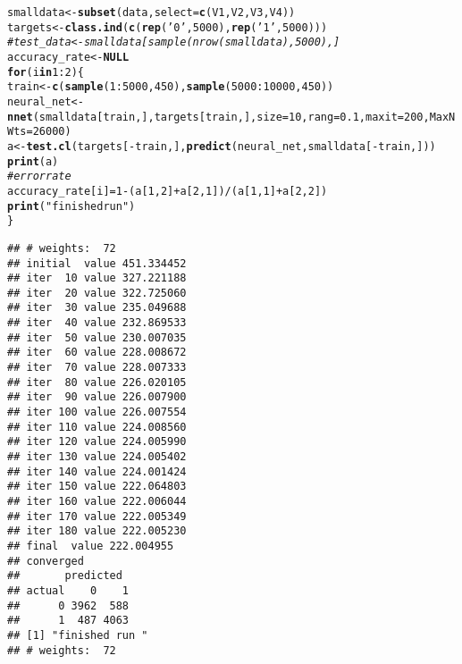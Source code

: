 \documentclass[titlepage]{article}\usepackage[]{graphicx}\usepackage[]{color}
\makeatletter
\newcommand{\hlnum}[1]{\textcolor[rgb]{0.686,0.059,0.569}{#1}}%
\newcommand{\hlstr}[1]{\textcolor[rgb]{0.192,0.494,0.8}{#1}}%
\newcommand{\hlcom}[1]{\textcolor[rgb]{0.678,0.584,0.686}{\textit{#1}}}%
\newcommand{\hlopt}[1]{\textcolor[rgb]{0,0,0}{#1}}%
\newcommand{\hlstd}[1]{\textcolor[rgb]{0.345,0.345,0.345}{#1}}%
\newcommand{\hlkwa}[1]{\textcolor[rgb]{0.161,0.373,0.58}{\textbf{#1}}}%
\newcommand{\hlkwb}[1]{\textcolor[rgb]{0.69,0.353,0.396}{#1}}%
\newcommand{\hlkwc}[1]{\textcolor[rgb]{0.333,0.667,0.333}{#1}}%
\newcommand{\hlkwd}[1]{\textcolor[rgb]{0.737,0.353,0.396}{\textbf{#1}}}%
\newenvironment{kframe}{%
 \def\at@end@of@kframe{}%
 \ifinner\ifhmode%
  \def\at@end@of@kframe{\end{minipage}}%
  \begin{minipage}{\columnwidth}%
 \fi\fi%
 \def\FrameCommand##1{\hskip\@totalleftmargin \hskip-\fboxsep
 \colorbox{shadecolor}{##1}\hskip-\fboxsep
     \hskip-\linewidth \hskip-\@totalleftmargin \hskip\columnwidth}%
 \MakeFramed {\advance\hsize-\width
   \@totalleftmargin\z@ \linewidth\hsize
   \@setminipage}}%
 {\par\unskip\endMakeFramed%
 \at@end@of@kframe}
\newenvironment{knitrout}{}{} %
\makeatother
\begin{document}
\begin{knitrout}
\color{fgcolor}\begin{kframe}
\begin{alltt}
\hlstd{smalldata} \hlkwb{<-} \hlkwd{subset}\hlstd{(data,} \hlkwc{select} \hlstd{=} \hlkwd{c}\hlstd{(V1,V2, V3, V4))}
\hlstd{targets} \hlkwb{<-} \hlkwd{class.ind}\hlstd{(}\hlkwd{c}\hlstd{(}\hlkwd{rep}\hlstd{(}\hlstr{'0'}\hlstd{,} \hlnum{5000}\hlstd{),} \hlkwd{rep}\hlstd{(}\hlstr{'1'}\hlstd{,}\hlnum{5000}\hlstd{)))}
\hlcom{#test_data <- smalldata[sample(nrow(smalldata), 5000),]}
\hlstd{accuracy_rate} \hlkwb{<-} \hlkwa{NULL}
\hlkwa{for} \hlstd{(i} \hlkwa{in} \hlnum{1}\hlopt{:}\hlnum{2}\hlstd{) \{}
  \hlstd{train} \hlkwb{<-} \hlkwd{c}\hlstd{(}\hlkwd{sample}\hlstd{(}\hlnum{1}\hlopt{:}\hlnum{5000}\hlstd{,} \hlnum{450}\hlstd{),} \hlkwd{sample}\hlstd{(}\hlnum{5000}\hlopt{:}\hlnum{10000}\hlstd{,}\hlnum{450}\hlstd{))}
  \hlstd{neural_net} \hlkwb{<-} \hlkwd{nnet}\hlstd{(smalldata[train,], targets[train,],} \hlkwc{size}\hlstd{=}\hlnum{10}\hlstd{,} \hlkwc{rang} \hlstd{=} \hlnum{0.1}\hlstd{,} \hlkwc{maxit} \hlstd{=}\hlnum{200}\hlstd{,} \hlkwc{MaxNWts} \hlstd{=} \hlnum{26000}\hlstd{)}
  \hlstd{a} \hlkwb{<-} \hlkwd{test.cl}\hlstd{(targets[}\hlopt{-}\hlstd{train,],} \hlkwd{predict}\hlstd{(neural_net, smalldata[}\hlopt{-}\hlstd{train,]))}
  \hlkwd{print}\hlstd{(a)}
  \hlcom{# error rate}
  \hlstd{accuracy_rate[i]} \hlkwb{=} \hlnum{1}\hlopt{-}\hlstd{(a[}\hlnum{1}\hlstd{,}\hlnum{2}\hlstd{]}\hlopt{+}\hlstd{a[}\hlnum{2}\hlstd{,}\hlnum{1}\hlstd{])} \hlopt{/} \hlstd{(a[}\hlnum{1}\hlstd{,}\hlnum{1}\hlstd{]}\hlopt{+}\hlstd{a[}\hlnum{2}\hlstd{,}\hlnum{2}\hlstd{])}
  \hlkwd{print}\hlstd{(}\hlstr{"finished run "}\hlstd{)}
\hlstd{\}}
\end{alltt}
\begin{verbatim}
## # weights:  72
## initial  value 451.334452 
## iter  10 value 327.221188
## iter  20 value 322.725060
## iter  30 value 235.049688
## iter  40 value 232.869533
## iter  50 value 230.007035
## iter  60 value 228.008672
## iter  70 value 228.007333
## iter  80 value 226.020105
## iter  90 value 226.007900
## iter 100 value 226.007554
## iter 110 value 224.008560
## iter 120 value 224.005990
## iter 130 value 224.005402
## iter 140 value 224.001424
## iter 150 value 222.064803
## iter 160 value 222.006044
## iter 170 value 222.005349
## iter 180 value 222.005230
## final  value 222.004955 
## converged
##       predicted
## actual    0    1
##      0 3962  588
##      1  487 4063
## [1] "finished run "
## # weights:  72

\end{verbatim}
\end{kframe}
\end{knitrout}
\end{document}
